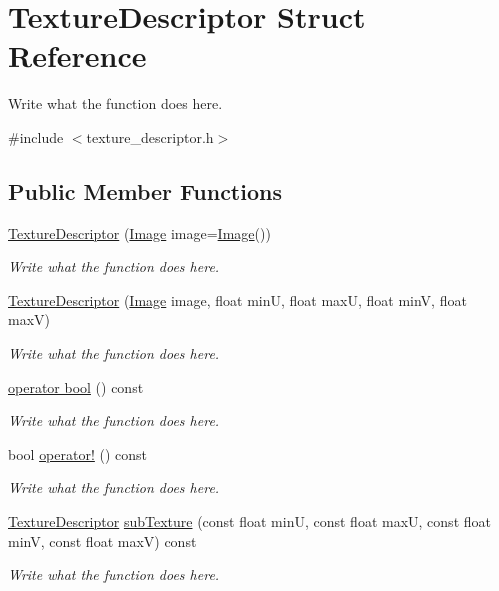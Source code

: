\hypertarget{structTextureDescriptor}{\section{Texture\+Descriptor Struct Reference}
\label{structTextureDescriptor}
}


Write what the function does here.  




{\ttfamily \#include $<$texture\+\_\+descriptor.\+h$>$}

\subsection*{Public Member Functions}
\begin{DoxyCompactItemize}
\item 
\hyperlink{structTextureDescriptor_a96245b9611b645eac88050ef4d70f2c2}{Texture\+Descriptor} (\hyperlink{classImage}{Image} image=\hyperlink{classImage}{Image}())
\begin{DoxyCompactList}\small\item\em Write what the function does here. \end{DoxyCompactList}\item 
\hyperlink{structTextureDescriptor_affe5fe65a87405a17a428fe725dc78c3}{Texture\+Descriptor} (\hyperlink{classImage}{Image} image, float min\+U, float max\+U, float min\+V, float max\+V)
\begin{DoxyCompactList}\small\item\em Write what the function does here. \end{DoxyCompactList}\item 
\hyperlink{structTextureDescriptor_a41a7fa119f03e28d9b3ae556fb6ff268}{operator bool} () const 
\begin{DoxyCompactList}\small\item\em Write what the function does here. \end{DoxyCompactList}\item 
bool \hyperlink{structTextureDescriptor_ad0465f550a605451e2c40a31a491c7b6}{operator!} () const 
\begin{DoxyCompactList}\small\item\em Write what the function does here. \end{DoxyCompactList}\item 
\hyperlink{structTextureDescriptor}{Texture\+Descriptor} \hyperlink{structTextureDescriptor_a03c94da9644d4992e51768aca4eb22ae}{sub\+Texture} (const float min\+U, const float max\+U, const float min\+V, const float max\+V) const 
\begin{DoxyCompactList}\small\item\em Write what the function does here. \end{DoxyCompactList}\end{DoxyCompactItemize}
